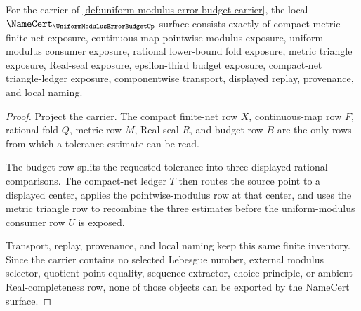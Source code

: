 \begin{theorem}
\label{thm:uniform-modulus-error-budget-namecert-obligations}
For the carrier of \autoref{def:uniform-modulus-error-budget-carrier}, the local $\NameCert_{\UniformModulusErrorBudgetUp}$ surface consists exactly of compact-metric finite-net exposure, continuous-map pointwise-modulus exposure, uniform-modulus consumer exposure, rational lower-bound fold exposure, metric triangle exposure, Real-seal exposure, epsilon-third budget exposure, compact-net triangle-ledger exposure, componentwise transport, displayed replay, provenance, and local naming.
\end{theorem}
\begin{proof}
Project the carrier. The compact finite-net row $X$, continuous-map row $F$, rational fold $Q$, metric row $M$, Real seal $R$, and budget row $B$ are the only rows from which a tolerance estimate can be read.

The budget row splits the requested tolerance into three displayed rational comparisons. The compact-net ledger $T$ then routes the source point to a displayed center, applies the pointwise-modulus row at that center, and uses the metric triangle row to recombine the three estimates before the uniform-modulus consumer row $U$ is exposed.

Transport, replay, provenance, and local naming keep this same finite inventory. Since the carrier contains no selected Lebesgue number, external modulus selector, quotient point equality, sequence extractor, choice principle, or ambient Real-completeness row, none of those objects can be exported by the NameCert surface.
\end{proof}

